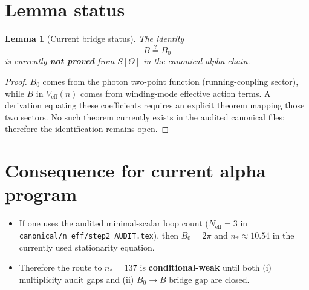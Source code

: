 \documentclass[12pt,a4paper]{article}
\newtheorem{lemma}[theorem]{Lemma}
\theoremstyle{remark}
\begin{document}
\section{Lemma status}
\begin{lemma}[Current bridge status]
The identity
\begin{equation}
B\stackrel{?}{=}B_0
\end{equation}
is currently \textbf{not proved} from $S[\Theta]$ in the canonical alpha chain.
\end{lemma}

\begin{proof}
$B_0$ comes from the photon two-point function (running-coupling sector), while
$B$ in $V_{\mathrm{eff}}(n)$ comes from winding-mode effective action terms.
A derivation equating these coefficients requires an explicit theorem mapping
those two sectors. No such theorem currently exists in the audited canonical
files; therefore the identification remains open.
\end{proof}

\section{Consequence for current alpha program}
\begin{itemize}
  \item If one uses the audited minimal-scalar loop count
  ($N_{\mathrm{eff}}=3$ in \texttt{canonical/n\_eff/step2\_AUDIT.tex}), then
  $B_0=2\pi$ and $n_*\approx 10.54$ in the currently used stationarity equation.
  \item Therefore the route to $n_*=137$ is \textbf{conditional-weak} until both
  (i) multiplicity audit gaps and (ii) $B_0\to B$ bridge gap are closed.
\end{itemize}

\ifdefined\INCLUDEMODE
\else
  
\end{document}
